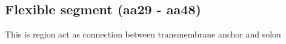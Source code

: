 \subsection{Flexible segment (aa29 - aa48)}

This is region act as connection between transmembrane anchor and solou
